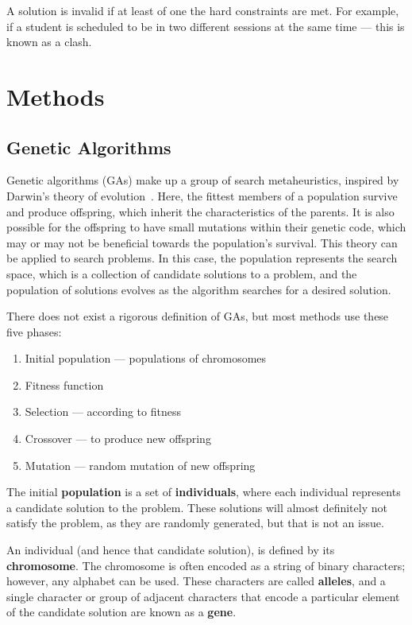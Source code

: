 A solution is invalid if at least of one the hard constraints are met.
For example, if a student is scheduled to be in two different sessions at the
same time --- this is known as a clash.

\section{Methods}

\subsection{Genetic Algorithms}

Genetic algorithms (GAs) make up a group of search metaheuristics, inspired by
Darwin's theory of evolution~\cite{ga_book}.
Here, the fittest members of a population survive and produce offspring, which
inherit the characteristics of the parents.
It is also possible for the offspring to have small mutations within their
genetic code, which may or may not be beneficial towards the population's
survival.
This theory can be applied to search problems.
In this case, the population represents the search space, which is a collection 
of candidate solutions to a problem, and the population of solutions evolves as
the algorithm searches for a desired solution.

There does not exist a rigorous definition of GAs, but most methods use these
five phases:

\begin{enumerate}
	\item Initial population --- populations of chromosomes
	\item Fitness function
	\item Selection --- according to fitness
	\item Crossover --- to produce new offspring
	\item Mutation --- random mutation of new offspring
\end{enumerate}

The initial \textbf{population} is a set of \textbf{individuals}, where each
individual represents a candidate solution to the problem.
These solutions will almost definitely not satisfy the problem, as they are
randomly generated, but that is not an issue.

An individual (and hence that candidate solution), is defined by its
\textbf{chromosome}.
The chromosome is often encoded as a string of binary characters; however, any
alphabet can be used.
These characters are called \textbf{alleles}, and a single character or group of
adjacent characters that encode a particular element of the candidate solution
are known as a \textbf{gene}.

